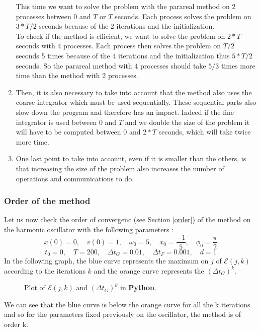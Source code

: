 \begin{enumerate}[label=\textbullet]
\begin{figure}[H]
		\label{efficient_2p_vs_4p}
	\end{figure}
	This time we want to solve the problem with the parareal method on 2 processes between 0 and $T$ or $T$ seconds. Each process solves the problem on $3*T/2$ seconds because of the 2 iterations and the initialization. \\
	To check if the method is efficient, we want to solve the problem on $2*T$ seconds with 4 processes. Each process then solves the problem on $T/2$ seconds 5 times because of the 4 iterations and the initialization thus $5*T/2$ seconds. So the parareal method with 4 processes should take $5/3$ times more time than the method with 2 processes.
	
	\item Then, it is also necessary to take into account that the method also uses the coarse integrator which must be used sequentially. These sequential parts also slow down the program and therefore has an impact. Indeed if the fine integrator is used between 0 and $T$ and we double the size of the problem it will have to be computed between 0 and $2*T$ seconds, which will take twice more time. 
	
	\item One last point to take into account, even if it is smaller than the others, is that increasing the size of the problem also increases the number of operations and communications to do.
\end{enumerate}


\subsubsection{Order of the method}

\noindent Let us now check the order of convergenc (see Section \ref{order}) of the method on the harmonic oscillator with the following parameters :
$$x(0) = 0, \quad v(0) = 1, \quad \omega_0 = 5, \quad x_0 = \frac{-1}{5}, \quad \phi_0 = \frac{\pi}{2}$$
$$t_0=0, \quad T=200, \quad \Delta t_G=0.01, \quad \Delta t_F=0.001, \quad d=1$$
In the following graph, the blue curve represents the maximum on $j$ of $\mathcal{E}(j,k)$ according to the iterations $k$ and the orange curve represents the $(\Delta t_G)^k$.
\begin{figure}[H]
	\centering
	\caption{Plot of $\mathcal{E}(j,k)$ and $(\Delta t_G)^k$ in \textbf{Python}.}
\end{figure}
\noindent We can see that the blue curve is below the orange curve for all the k iterations and so for the parameters fixed previously on the oscillator, the method is of order k.

